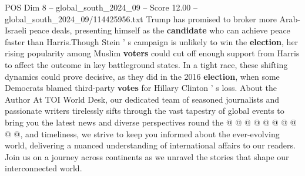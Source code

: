\begin{textsample}{POS Dim 8 – global\_south\_2024\_09 – Score 12.00 – global\_south\_2024\_09/114425956.txt}
Trump has promised to broker more Arab-Israeli peace deals, presenting himself as the \textbf{candidate} who can achieve peace faster than Harris.Though Stein ' s campaign is unlikely to win the \textbf{election}, her rising popularity among Muslim \textbf{voters} could cut off enough support from Harris to affect the outcome in key battleground states.
In a tight race, these shifting dynamics could prove decisive, as they did in the 2016 \textbf{election}, when some Democrats blamed third-party \textbf{votes} for Hillary Clinton ' s loss.
About the Author At TOI World Desk, our dedicated team of seasoned journalists and passionate writers tirelessly sifts through the vast tapestry of global events to bring you the latest news and diverse perspectives round the @ @ @ @ @ @ @ @ @ @, and timeliness, we strive to keep you informed about the ever-evolving world, delivering a nuanced understanding of international affairs to our readers.
Join us on a journey across continents as we unravel the stories that shape our interconnected world.

\end{textsample}
